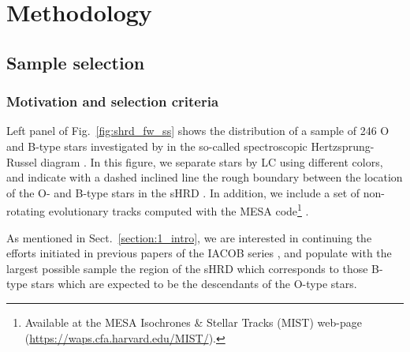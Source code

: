 \documentclass{aa}
\begin{document}



\section{Methodology}
\label{section:3_XXXXX}




\subsection{Sample selection}
\label{section:31_XXXXX}


\subsubsection{Motivation and selection criteria}
\label{section:311_XXXXX}


Left panel of Fig.~\ref{fig:shrd_fw_ss} shows the distribution of a sample of 246 O and B-type stars investigated by \citet{2017A&A...597A..22S} in the so-called spectroscopic Hertzsprung-Russel diagram \citep[sHRD, first utilized by][]{2014A&A...564A..52L}. In this figure, we separate stars by LC using different colors, and indicate with a dashed inclined line the rough boundary between the location of the O- and B-type stars in the sHRD \citep[see][]{2018A&A...613A..65Hol}. In addition, we include a set of non-rotating evolutionary tracks computed with the MESA code\footnote{Available at the MESA Isochrones \& Stellar Tracks (MIST) web-page (\url{https://waps.cfa.harvard.edu/MIST/}).} \citep[see][for references purposes]{2016ApJS..222....8D,2016ApJ...823..102C,2011ApJS..192....3P,2013ApJS..208....4P,2015ApJS..220...15P}.

As mentioned in Sect.~\ref{section:1_intro}, we are interested in continuing the efforts initiated in previous papers of the IACOB series \citep[referring to the O star domain, see][]{2020A&A...638A.157H,2022A&A...665A.150H}, and populate with the largest possible sample the region of the sHRD which corresponds to those B-type stars which are expected to be the descendants of the O-type stars.
\end{document}
